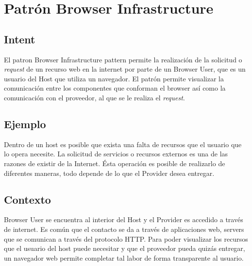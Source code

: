 \section{Patrón Browser Infrastructure}
\label{chap4:BrokerPatt}
\subsection{Intent}
El patron Browser Infrastructure pattern permite la realización de la solicitud o \textit{request} de un recurso web en la internet por parte de un Browser User, que es un usuario del Host que utiliza un navegador. El patrón permite visualizar la comunicación entre los componentes que conforman el browser así como la comunicación con el proveedor, al que se le realiza el \textit{request}.

\subsection{Ejemplo}
Dentro de un host es posible que exista una falta de recursos que el usuario que lo opera necesite. La solicitud de servicios o recursos externos es una de las razones de existir de la Internet. Ésta operación es posible de realizarlo de diferentes maneras, todo depende de lo que el Provider desea entregar.

\subsection{Contexto}
Browser User se encuentra al interior del Host y el Provider es accedido a través de internet.  Es común que el contacto se da a través de aplicaciones web, servers que se comunican a través del protocolo HTTP. Para poder visualizar los recursos que el usuario del host puede necesitar y que el proveedor pueda quizás entregar, un navegador web permite completar tal labor de forma transparente al usuario.
